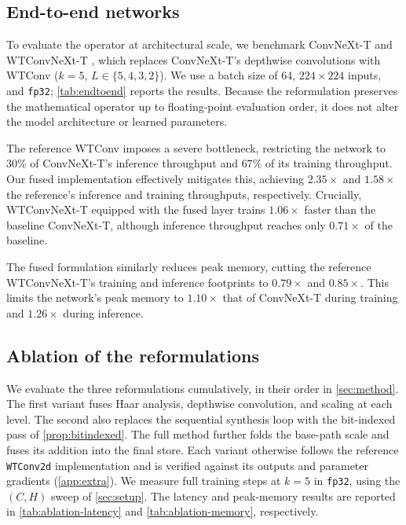 \documentclass[10pt]{article} %
\theoremstyle{plain}
\begin{document}
\subsection{End-to-end networks}
\label{sec:results-endtoend}


To evaluate the operator at architectural scale, we benchmark ConvNeXt-T and WTConvNeXt-T \citep{finder2024wavelet}, which replaces ConvNeXt-T's depthwise convolutions with WTConv ($k{=}5$, $L{\in}\{5,4,3,2\}$). We use a batch size of 64, $224\times224$ inputs, and \texttt{fp32}; \autoref{tab:endtoend} reports the results. Because the reformulation preserves the mathematical operator up to floating-point evaluation order, it does not alter the model architecture or learned parameters.

The reference WTConv imposes a severe bottleneck, restricting the network to $30\%$ of ConvNeXt-T's inference throughput and $67\%$ of its training throughput. Our fused implementation effectively mitigates this, achieving $2.35\times$ and $1.58\times$ the reference's inference and training throughputs, respectively. Crucially, WTConvNeXt-T equipped with the fused layer trains $1.06\times$ faster than the baseline ConvNeXt-T, although inference throughput reaches only $0.71\times$ of the baseline.

The fused formulation similarly reduces peak memory, cutting the reference WTConvNeXt-T's training and inference footprints to $0.79\times$ and $0.85\times$. This limits the network's peak memory to $1.10\times$ that of ConvNeXt-T during training and $1.26\times$ during inference.

\subsection{Ablation of the reformulations}
\label{sec:results-ablation}

We evaluate the three reformulations cumulatively, in their order in \autoref{sec:method}. The first
variant fuses Haar analysis, depthwise convolution, and scaling at each level. The second also
replaces the sequential synthesis loop with the bit-indexed pass of \autoref{prop:bitindexed}. The
full method further folds the base-path scale and fuses its addition into the final store. Each
variant otherwise follows the reference \texttt{WTConv2d} implementation and is verified against
its outputs and parameter gradients (\autoref{app:extra}). We measure full training steps at
$k{=}5$ in \texttt{fp32}, using the $(C,H)$ sweep of \autoref{sec:setup}. The latency and peak-memory
results are reported in \autoref{tab:ablation-latency} and \autoref{tab:ablation-memory}, respectively.
\end{document}
